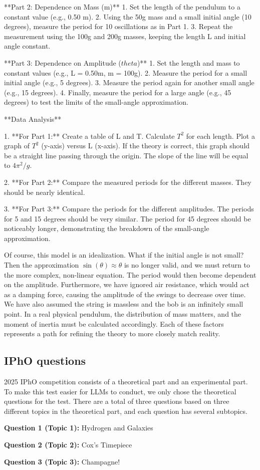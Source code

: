 \documentclass[12pt]{article}
\begin{document}
**Part 2: Dependence on Mass (m)**
1.  Set the length of the pendulum to a constant value (e.g., 0.50 m).
2.  Using the 50g mass and a small initial angle (10 degrees), measure the period for 10 oscillations as in Part 1.
3.  Repeat the measurement using the 100g and 200g masses, keeping the length L and initial angle constant.

**Part 3: Dependence on Amplitude (\(theta\))**
1.  Set the length and mass to constant values (e.g., L = 0.50m, m = 100g).
2.  Measure the period for a small initial angle (e.g., 5 degrees).
3.  Measure the period again for another small angle (e.g., 15 degrees).
4.  Finally, measure the period for a large angle (e.g., 45 degrees) to test the limits of the small-angle approximation.

**Data Analysis**

1.  **For Part 1:** Create a table of L and T. Calculate \(T^2\) for each length. Plot a graph of \(T^2\) (y-axis) versus L (x-axis). If the theory is correct, this graph should be a straight line passing through the origin. The slope of the line will be equal to \(4\pi^2/g\).

2.  **For Part 2:** Compare the measured periods for the different masses. They should be nearly identical.

3.  **For Part 3:** Compare the periods for the different amplitudes. The periods for 5 and 15 degrees should be very similar. The period for 45 degrees should be noticeably longer, demonstrating the breakdown of the small-angle approximation.
\par
\bigskip

Of course, this model is an idealization. What if the initial angle is not small? Then the approximation \(\sin(\theta) \approx \theta\) is no longer valid, and we must return to the more complex, non-linear equation. The period would then become dependent on the amplitude. Furthermore, we have ignored air resistance, which would act as a damping force, causing the amplitude of the swings to decrease over time. We have also assumed the string is massless and the bob is an infinitely small point. In a real physical pendulum, the distribution of mass matters, and the moment of inertia must be calculated accordingly. Each of these factors represents a path for refining the theory to more closely match reality.

\subsection{IPhO questions}
2025 IPhO competition consists of a theoretical part and an experimental part. To make this test easier for LLMs to conduct, we only chose the theoretical questions for the test. There are a total of three questions based on three different topics in the theoretical part, and each question has several subtopics. 
\par
\bigskip
\textbf{Question 1 (Topic 1):}
Hydrogen and Galaxies
\par
\bigskip
\textbf{Question 2 (Topic 2):}
Cox's Timepiece
\par
\bigskip
\textbf{Question 3 (Topic 3):}
Champagne!
\end{document}
